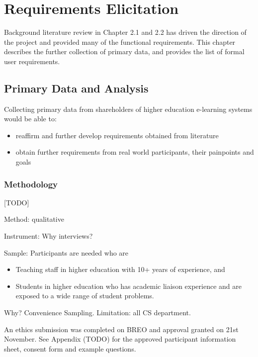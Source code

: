 \chapter{Requirements Elicitation}
\graphicspath{{Chapter4/Figs/Raster/}{Chapter4/Figs/}}

Background literature review in Chapter 2.1 and 2.2 has driven the direction of the project and
provided many of the functional requirements. This chapter describes the further collection of primary
data, and provides the list of formal user requirements.

\section{Primary Data and Analysis}
Collecting primary data from shareholders of higher education e-learning systems would be able to:
\begin{itemize}
	\setlength\itemsep{0em}	
	\item reaffirm and further develop requirements obtained from literature
	\item obtain further requirements from real world participants, their painpoints and goals
\end{itemize}

\subsection{Methodology}

[TODO]

Method: qualitative

Instrument: Why interviews?

Sample: Participants are needed who are
\begin{itemize}
	\setlength\itemsep{0em}	
	\item Teaching staff in higher education with 10+ years of experience, and
	\item Students in higher education who has academic liaison experience and are exposed to a wide range of student problems.
\end{itemize}

Why? Convenience Sampling. Limitation: all CS department.

An ethics submission was completed on BREO and approval granted on 21st November.
See Appendix (TODO) for the approved participant information sheet, consent form and example questions.

